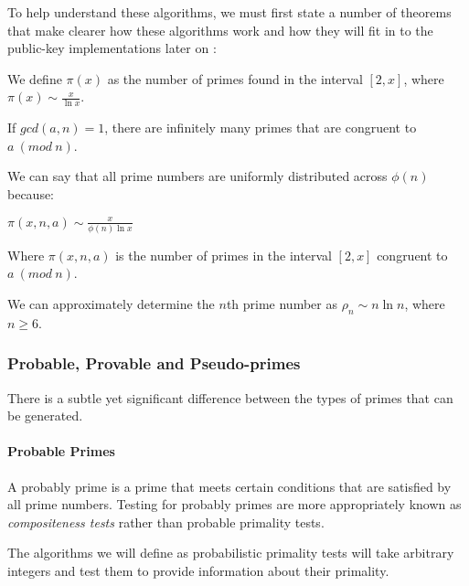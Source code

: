   To help understand these algorithms, we must first state a number of theorems that make clearer how these algorithms work and how they will fit in to the public-key implementations later on \cite{Alfred-Menezes:1996kx}: \\
  
  \begin{mathdef}
    We define $\pi(x)$ as the number of primes found in the interval $[2,x]$, where $\pi(x) \sim \frac{x}{\ln x}$.
  \end{mathdef}
  
  \begin{mathfact}
    If $gcd(a,n) = 1$, there are infinitely many primes that are congruent to $a \ (mod \ n)$.
  \end{mathfact}
  
  \begin{mathfact}
    We can say that all prime numbers are uniformly distributed across $\phi(n)$ because:
    \begin{center}
    	$\pi(x,n,a) \sim \frac{x}{\phi(n) \ln x}$
    \end{center}
    Where $\pi(x,n,a)$ is the number of primes in the interval $[2,x]$ congruent to $a \ (mod \ n)$.
  \end{mathfact}
  
  \begin{mathfact}
    We can approximately determine the $n$th prime number as $\rho_n \sim n \ln n$, where $n \geq 6$.
  \end{mathfact}
  
    \subsubsection{Probable, Provable and Pseudo-primes}
    
    There is a subtle yet significant difference between the types of primes that can be generated.
    
      \paragraph{Probable Primes}
      
      A probably prime is a prime that meets certain conditions that are satisfied by all prime numbers. Testing for probably primes are more appropriately known as \emph{compositeness tests} rather than probable primality tests.
      
      The algorithms we will define as probabilistic primality tests will take arbitrary integers and test them to provide information about their primality. 
      

